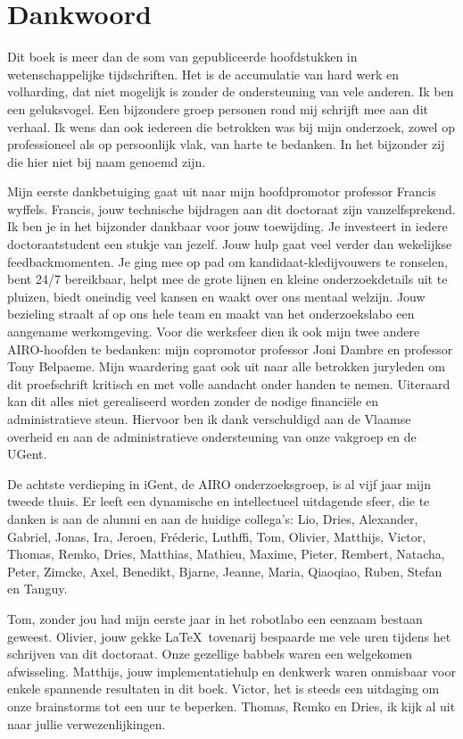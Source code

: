 \documentclass[\home/main.tex]{subfiles}
\begin{document}
\chapter{Dankwoord}

Dit boek is meer dan de som van gepubliceerde hoofdstukken in wetenschappelijke tijdschriften. Het is de accumulatie van hard werk en volharding, dat niet mogelijk is zonder de ondersteuning van vele anderen. Ik ben een geluksvogel. Een bijzondere groep personen rond mij schrijft mee aan dit verhaal. Ik wens dan ook iedereen die betrokken was bij mijn onderzoek, zowel op professioneel als op persoonlijk vlak, van harte te bedanken. In het bijzonder zij die hier niet bij naam genoemd zijn.
 
Mijn eerste dankbetuiging gaat uit naar mijn hoofdpromotor professor Francis wyffels. Francis, jouw technische bijdragen aan dit doctoraat zijn vanzelfsprekend. Ik ben je in het bijzonder dankbaar voor jouw toewijding. Je investeert in iedere doctoraatstudent een stukje van jezelf. Jouw hulp gaat veel verder dan wekelijkse feedbackmomenten. Je ging mee op pad om kandidaat-kledijvouwers te ronselen, bent 24/7 bereikbaar, helpt mee de grote lijnen en kleine onderzoekdetails uit te pluizen, biedt oneindig veel kansen en waakt over ons mentaal welzijn. Jouw bezieling straalt af op ons hele team en maakt van het onderzoekslabo een aangename werkomgeving.
Voor die werksfeer dien ik ook mijn twee andere AIRO-hoofden te bedanken: mijn copromotor professor Joni Dambre en professor Tony Belpaeme. 
Mijn waardering gaat ook uit naar alle betrokken juryleden om dit proefschrift kritisch en met volle aandacht onder handen te nemen.
Uiteraard kan dit alles niet gerealiseerd worden zonder de nodige financiële en administratieve steun. Hiervoor ben ik dank verschuldigd aan de Vlaamse overheid en aan de administratieve ondersteuning van onze vakgroep en de UGent.
 
De achtste verdieping in iGent, de AIRO onderzoeksgroep, is al vijf jaar mijn tweede thuis. Er leeft een dynamische en intellectueel uitdagende sfeer, die te danken is aan de alumni en aan de huidige collega’s: Lio, Dries, Alexander, Gabriel, Jonas, Ira, Jeroen, Fréderic, Luthffi, Tom, Olivier, Matthijs, Victor, Thomas, Remko, Dries, Matthias, Mathieu, Maxime, Pieter, Rembert, Natacha, Peter, Zimcke, Axel, Benedikt, Bjarne, Jeanne, Maria, Qiaoqiao, Ruben, Stefan en Tanguy.
 
Tom, zonder jou had mijn eerste jaar in het robotlabo een eenzaam bestaan geweest. 
Olivier, jouw gekke \LaTeX\ tovenarij bespaarde me vele uren tijdens het schrijven van dit doctoraat. Onze gezellige babbels waren een welgekomen afwisseling.
Matthijs, jouw implementatiehulp en denkwerk waren onmisbaar voor enkele spannende resultaten in dit boek.
Victor, het is steeds een uitdaging om onze brainstorms tot een uur te beperken.
Thomas, Remko en Dries, ik kijk al uit naar jullie verwezenlijkingen. 
 
\end{document}
